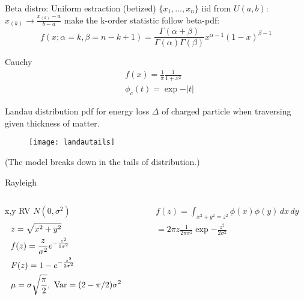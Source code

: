 \begin{frame}{Beta distro: Uniform estraction (betized)}
$\{x_1,\ldots,x_n\}$ iid from $U(a,b)$: $x_{(k)}\to\frac{x_{(k)}-a}{b-a}$ make the k-order statistic follow beta-pdf:
\[f(x;\alpha=k,\beta=n-k+1)=\frac{\Gamma(\alpha+\beta)}{\Gamma(\alpha)\Gamma(\beta)}x^{\alpha-1}(1-x)^{\beta-1}\]
\end{frame}

\begin{frame}{Cauchy}
\begin{align*}
&f(x)=\frac{1}{\pi}\frac{1}{1+x^2}\\
&\phi_c(t)=\exp{-|t|}
\end{align*}
\end{frame}

\begin{frame}{Landau distribution}
pdf for energy loss $\Delta$ of charged particle when traversing given thickness of matter.
\begin{figure}[!ht]\texttt{[image: landautails]}\label{fig:landautails}\end{figure}
(The model breaks down in the tails of distribution.)
\end{frame}

\begin{frame}{Rayleigh}
\begin{columns}[T]\begin{column}{0.5\textwidth}
x,y RV $N(0,\sigma^2)$
\begin{align*}
&z=\sqrt{x^2+y^2}\\
&f(z)=\frac{z}{\sigma^2}e^{-\frac{z^2}{2\sigma^2}}\\
&F(z)=1-e^{-\frac{z^2}{2\sigma^2}}\\
&\mu=\sigma\sqrt{\frac{\pi}{2}},\ \operatorname{Var}=(2-\pi/2)\sigma^2
\end{align*}
\end{column}\begin{column}{0.5\textwidth}
\begin{align*}
&f(z)=\int_{x^2+y^2=z^2}\phi(x)\phi(y)\,dx\,dy\\
&=2\pi z\frac{1}{2\pi\sigma^2}\exp{-\frac{z^2}{2\sigma^2}}
\end{align*}
\end{column}\end{columns}
\end{frame}

